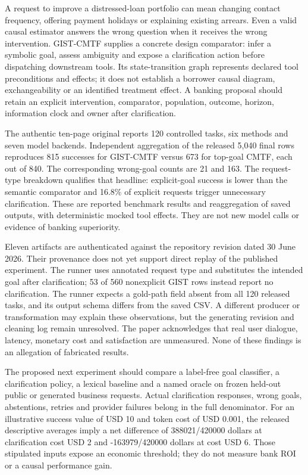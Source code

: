 A request to improve a distressed-loan portfolio can mean changing
contact frequency, offering payment holidays or explaining existing
arrears. Even a valid causal estimator answers the wrong question when
it receives the wrong intervention. GIST-CMTF supplies a concrete design
comparator: infer a symbolic goal, assess ambiguity and expose a
clarification action before dispatching downstream tools. Its
state-transition graph represents declared tool preconditions and
effects; it does not establish a borrower causal diagram,
exchangeability or an identified treatment effect. A banking proposal
should retain an explicit intervention, comparator, population, outcome,
horizon, information clock and owner after clarification.
\citep{exec23_gist_paper,exec23_gist_sources}

The authentic ten-page original reports 120 controlled tasks, six
methods and seven model backends. Independent aggregation of the
released 5,040 final rows reproduces 815 successes for GIST-CMTF versus
673 for top-goal CMTF, each out of 840. The corresponding wrong-goal
counts are 21 and 163. The request-type breakdown qualifies that
headline: explicit-goal success is lower than the semantic comparator
and 16.8\% of explicit requests trigger unnecessary clarification. These
are reported benchmark results and reaggregation of saved outputs, with
deterministic mocked tool effects. They are not new model calls or
evidence of banking superiority.
\citep{exec23_gist_paper,exec23_gist_sources,exec23_gist_reference}

Eleven artifacts are authenticated against the repository revision dated
30 June 2026. Their provenance does not yet support direct replay of the
published experiment. The runner uses annotated request type and
substitutes the intended goal after clarification; 53 of 560 nonexplicit
GIST rows instead report no clarification. The runner expects a
gold-path field absent from all 120 released tasks, and its output
schema differs from the saved CSV. A different producer or
transformation may explain these observations, but the generating
revision and cleaning log remain unresolved. The paper acknowledges that
real user dialogue, latency, monetary cost and satisfaction are
unmeasured. None of these findings is an allegation of fabricated
results.
\citep{exec23_gist_paper,exec23_gist_sources,exec23_gist_reference}

The proposed next experiment should compare a label-free goal
classifier, a clarification policy, a lexical baseline and a named
oracle on frozen held-out public or generated business requests. Actual
clarification responses, wrong goals, abstentions, retries and provider
failures belong in the full denominator. For an illustrative success
value of USD 10 and token cost of USD 0.001, the released descriptive
averages imply a net difference of 388021/420000 dollars at
clarification cost USD 2 and -163979/420000 dollars at cost USD 6. Those
stipulated inputs expose an economic threshold; they do not measure bank
ROI or a causal performance gain. \citep{exec23_gist_reference}

